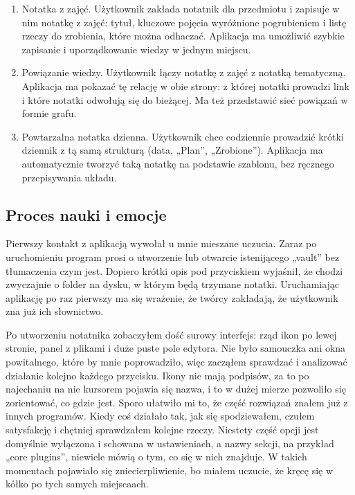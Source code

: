 \documentclass[11pt,a4paper]{article}
\begin{document}
\begin{enumerate}[leftmargin=*]
  \item Notatka z zajęć. Użytkownik zakłada notatnik dla przedmiotu i zapisuje w nim notatkę z zajęć: tytuł, kluczowe pojęcia wyróżnione pogrubieniem i listę rzeczy do zrobienia, które można odhaczać. Aplikacja ma umożliwić szybkie zapisanie i uporządkowanie wiedzy w jednym miejscu.
  \item Powiązanie wiedzy. Użytkownik łączy notatkę z zajęć z notatką tematyczną. Aplikacja ma pokazać tę relację w obie strony: z której notatki prowadzi link i które notatki odwołują się do bieżącej. Ma też przedstawić sieć powiązań w formie grafu.
  \item Powtarzalna notatka dzienna. Użytkownik chce codziennie prowadzić krótki dziennik z tą samą strukturą (data, „Plan”, „Zrobione”). Aplikacja ma automatycznie tworzyć taką notatkę na podstawie szablonu, bez ręcznego przepisywania układu.
\end{enumerate}

\subsection{Proces nauki i emocje}

Pierwszy kontakt z aplikacją wywołał u mnie mieszane uczucia. Zaraz po uruchomieniu program prosi o utworzenie lub otwarcie istenijącego „vault” bez tłumaczenia czym jest. Dopiero krótki opis pod przyciskiem wyjaśnił, że chodzi zwyczajnie o folder na dysku, w którym będą trzymane notatki. Uruchamiając aplikację po raz pierwszy ma się wrażenie, że twórcy zakładają, że użytkownik zna już ich słownictwo.

Po utworzeniu notatnika zobaczyłem dość surowy interfejs: rząd ikon po lewej stronie, panel z plikami i duże puste pole edytora. Nie było samouczka ani okna powitalnego, które by mnie poprowadziło, więc zacząłem sprawdzać i analizować działanie kolejno każdego przycisku. Ikony nie mają podpisów, za to po najechaniu na nie kursorem pojawia się nazwa, i to w dużej mierze pozwoliło się zorientować, co gdzie jest. Sporo ułatwiło mi to, że część rozwiązań znałem już z innych programów. Kiedy coś działało tak, jak się spodziewałem, czułem satysfakcję i chętniej sprawdzałem kolejne rzeczy. Niestety część opcji jest domyślnie wyłączona i schowana w ustawieniach, a nazwy sekcji, na przykład „core plugins”, niewiele mówią o tym, co się w nich znajduje. W takich momentach pojawiało się zniecierpliwienie, bo miałem uczucie, że kręcę się w kółko po tych samych miejscaach.
\end{document}
